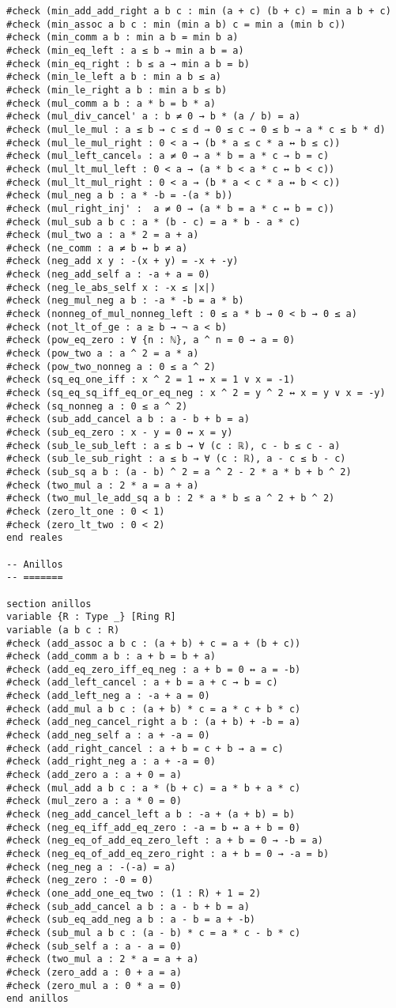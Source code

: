 \begin{verbatim}
#check (min_add_add_right a b c : min (a + c) (b + c) = min a b + c)
#check (min_assoc a b c : min (min a b) c = min a (min b c))
#check (min_comm a b : min a b = min b a)
#check (min_eq_left : a ≤ b → min a b = a)
#check (min_eq_right : b ≤ a → min a b = b)
#check (min_le_left a b : min a b ≤ a)
#check (min_le_right a b : min a b ≤ b)
#check (mul_comm a b : a * b = b * a)
#check (mul_div_cancel' a : b ≠ 0 → b * (a / b) = a)
#check (mul_le_mul : a ≤ b → c ≤ d → 0 ≤ c → 0 ≤ b → a * c ≤ b * d)
#check (mul_le_mul_right : 0 < a → (b * a ≤ c * a ↔ b ≤ c))
#check (mul_left_cancel₀ : a ≠ 0 → a * b = a * c → b = c)
#check (mul_lt_mul_left : 0 < a → (a * b < a * c ↔ b < c))
#check (mul_lt_mul_right : 0 < a → (b * a < c * a ↔ b < c))
#check (mul_neg a b : a * -b = -(a * b))
#check (mul_right_inj' :  a ≠ 0 → (a * b = a * c ↔ b = c))
#check (mul_sub a b c : a * (b - c) = a * b - a * c)
#check (mul_two a : a * 2 = a + a)
#check (ne_comm : a ≠ b ↔ b ≠ a)
#check (neg_add x y : -(x + y) = -x + -y)
#check (neg_add_self a : -a + a = 0)
#check (neg_le_abs_self x : -x ≤ |x|)
#check (neg_mul_neg a b : -a * -b = a * b)
#check (nonneg_of_mul_nonneg_left : 0 ≤ a * b → 0 < b → 0 ≤ a)
#check (not_lt_of_ge : a ≥ b → ¬ a < b)
#check (pow_eq_zero : ∀ {n : ℕ}, a ^ n = 0 → a = 0)
#check (pow_two a : a ^ 2 = a * a)
#check (pow_two_nonneg a : 0 ≤ a ^ 2)
#check (sq_eq_one_iff : x ^ 2 = 1 ↔ x = 1 ∨ x = -1)
#check (sq_eq_sq_iff_eq_or_eq_neg : x ^ 2 = y ^ 2 ↔ x = y ∨ x = -y)
#check (sq_nonneg a : 0 ≤ a ^ 2)
#check (sub_add_cancel a b : a - b + b = a)
#check (sub_eq_zero : x - y = 0 ↔ x = y)
#check (sub_le_sub_left : a ≤ b → ∀ (c : ℝ), c - b ≤ c - a)
#check (sub_le_sub_right : a ≤ b → ∀ (c : ℝ), a - c ≤ b - c)
#check (sub_sq a b : (a - b) ^ 2 = a ^ 2 - 2 * a * b + b ^ 2)
#check (two_mul a : 2 * a = a + a)
#check (two_mul_le_add_sq a b : 2 * a * b ≤ a ^ 2 + b ^ 2)
#check (zero_lt_one : 0 < 1)
#check (zero_lt_two : 0 < 2)
end reales

-- Anillos
-- =======

section anillos
variable {R : Type _} [Ring R]
variable (a b c : R)
#check (add_assoc a b c : (a + b) + c = a + (b + c))
#check (add_comm a b : a + b = b + a)
#check (add_eq_zero_iff_eq_neg : a + b = 0 ↔ a = -b)
#check (add_left_cancel : a + b = a + c → b = c)
#check (add_left_neg a : -a + a = 0)
#check (add_mul a b c : (a + b) * c = a * c + b * c)
#check (add_neg_cancel_right a b : (a + b) + -b = a)
#check (add_neg_self a : a + -a = 0)
#check (add_right_cancel : a + b = c + b → a = c)
#check (add_right_neg a : a + -a = 0)
#check (add_zero a : a + 0 = a)
#check (mul_add a b c : a * (b + c) = a * b + a * c)
#check (mul_zero a : a * 0 = 0)
#check (neg_add_cancel_left a b : -a + (a + b) = b)
#check (neg_eq_iff_add_eq_zero : -a = b ↔ a + b = 0)
#check (neg_eq_of_add_eq_zero_left : a + b = 0 → -b = a)
#check (neg_eq_of_add_eq_zero_right : a + b = 0 → -a = b)
#check (neg_neg a : -(-a) = a)
#check (neg_zero : -0 = 0)
#check (one_add_one_eq_two : (1 : R) + 1 = 2)
#check (sub_add_cancel a b : a - b + b = a)
#check (sub_eq_add_neg a b : a - b = a + -b)
#check (sub_mul a b c : (a - b) * c = a * c - b * c)
#check (sub_self a : a - a = 0)
#check (two_mul a : 2 * a = a + a)
#check (zero_add a : 0 + a = a)
#check (zero_mul a : 0 * a = 0)
end anillos


\end{verbatim}
